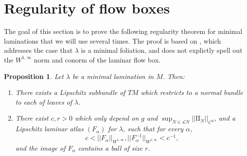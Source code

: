 \documentclass[reqno,11pt]{amsart}
\newcommand{\Leaves}{\mathscr L}
\newcommand{\Two}{\mathrm{I\!I}}
\newtheorem{proposition}[theorem]{Proposition}
\theoremstyle{definition}
\numberwithin{equation}{section}
\begin{document}
\section{Regularity of flow boxes}\label{Regularity}
The goal of this section is to prove the following regularity theorem for minimal laminations that we will use several times.
The proof is based on \cite[Theorem 1.1]{Solomon86}, which addresses the case that $\lambda$ is a minimal foliation, and does not explictly spell out the $W^{1, \infty}$ norm and conorm of the laminar flow box.

\begin{proposition}\label{regularity theorem}
Let $\lambda$ be a minimal lamination in $M$. Then:
\begin{enumerate}
\item There exists a Lipschitz subbundle of $TM$ which restricts to a normal bundle to each of leaves of $\lambda$.
\item There exist $c, r > 0$ which only depend on $g$ and $\sup_{N \in \Leaves N} ||\Two_N||_{C^0}$, and a Lipschitz laminar atlas $(F_\alpha)$ for $\lambda$, such that for every $\alpha$,
\begin{equation}\label{conorm of flow box}
c < ||F_\alpha||_{W^{1, \infty}}, ||F^{-1}_\alpha||_{W^{1, \infty}} < c^{-1},
\end{equation}
and the image of $F_\alpha$ contains a ball of size $r$.
\end{enumerate}
\end{proposition}
\end{document}
